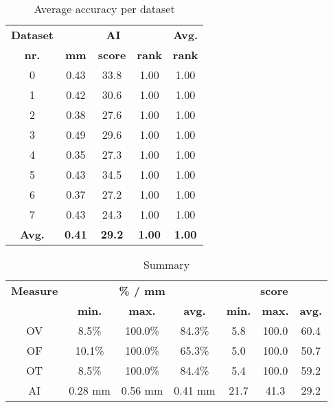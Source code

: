 \begin{table*}
\scriptsize
\caption{Average accuracy per dataset}
\centering
\begin{tabular}{|c|ccc|c|}
\hline
\multicolumn{1}{|c|}{\textbf{Dataset}} &\multicolumn{3}{c|}{\textbf{AI}} &\multicolumn{1}{c|}{\textbf{Avg.}} \\
\multicolumn{1}{|c|}{\textbf{nr.}} &\multicolumn{1}{c|}{\textbf{mm}} &\multicolumn{1}{c|}{\textbf{score}} &\multicolumn{1}{c|}{\textbf{rank}} &\multicolumn{1}{c|}{\textbf{rank}}\\
\hline
0&0.43&33.8& 1.00& 1.00\\
1&0.42&30.6& 1.00& 1.00\\
2&0.38&27.6& 1.00& 1.00\\
3&0.49&29.6& 1.00& 1.00\\
4&0.35&27.3& 1.00& 1.00\\
5&0.43&34.5& 1.00& 1.00\\
6&0.37&27.2& 1.00& 1.00\\
7&0.43&24.3& 1.00& 1.00\\
\hline
\textbf{Avg.}&\textbf{0.41}&\textbf{29.2}&\textbf{ 1.00}&\textbf{ 1.00}\\
\hline
\end{tabular}
\vspace{-0.3cm}
\label{tb:tb_4_2}
\normalsize
\end{table*}

\begin{table*}
\scriptsize
\caption{Summary}
\centering
\begin{tabular}{|c|ccc|ccc|}
\hline
\multicolumn{1}{|c|}{\textbf{Measure}} &\multicolumn{3}{c|}{\textbf{\% / mm}} &\multicolumn{3}{c|}{\textbf{score}}  \\
\multicolumn{1}{|c|}{\textbf{}} &\multicolumn{1}{c|}{\textbf{min.}} &\multicolumn{1}{c|}{\textbf{max.}} &\multicolumn{1}{c|}{\textbf{avg.}} &\multicolumn{1}{c|}{\textbf{min.}} &\multicolumn{1}{c|}{\textbf{max.}} &\multicolumn{1}{c|}{\textbf{avg.}}\\
\hline
OV& 8.5\%&100.0\%&84.3\%& 5.8&100.0&60.4\\
OF&10.1\%&100.0\%&65.3\%& 5.0&100.0&50.7\\
OT& 8.5\%&100.0\%&84.4\%& 5.4&100.0&59.2\\
AI&0.28 mm&0.56 mm&0.41 mm&21.7&41.3&29.2\\
\hline
\end{tabular}
\vspace{-0.3cm}
\label{tb:tb_4_3}
\normalsize
\end{table*}

